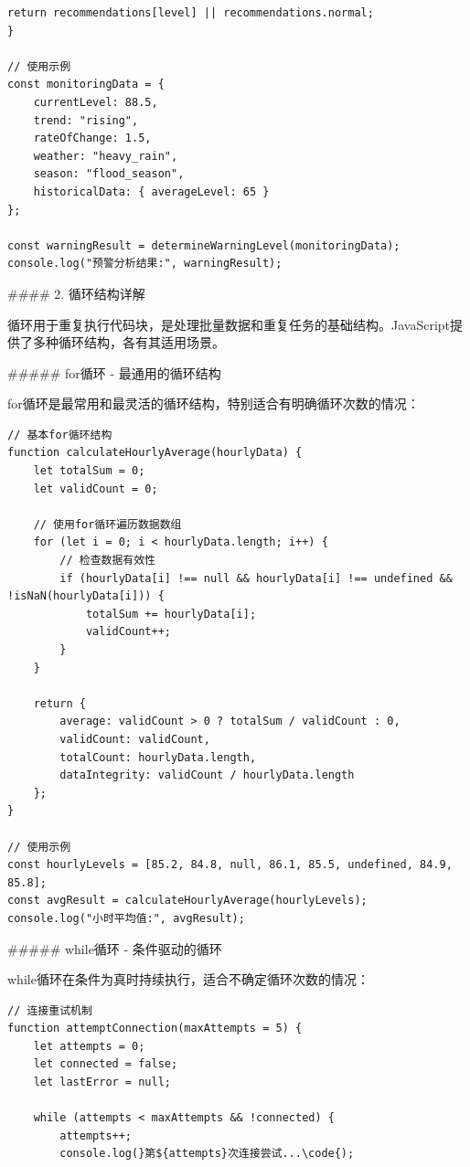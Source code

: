 {\begin{lstlisting}[style=javascript]
    return recommendations[level] || recommendations.normal;
}

// 使用示例
const monitoringData = {
    currentLevel: 88.5,
    trend: "rising",
    rateOfChange: 1.5,
    weather: "heavy_rain",
    season: "flood_season",
    historicalData: { averageLevel: 65 }
};

const warningResult = determineWarningLevel(monitoringData);
console.log("预警分析结果:", warningResult);
\end{lstlisting}

#### 2. 循环结构详解

循环用于重复执行代码块，是处理批量数据和重复任务的基础结构。JavaScript提供了多种循环结构，各有其适用场景。

##### for循环 - 最通用的循环结构

for循环是最常用和最灵活的循环结构，特别适合有明确循环次数的情况：

\begin{lstlisting}[style=javascript]
// 基本for循环结构
function calculateHourlyAverage(hourlyData) {
    let totalSum = 0;
    let validCount = 0;
    
    // 使用for循环遍历数据数组
    for (let i = 0; i < hourlyData.length; i++) {
        // 检查数据有效性
        if (hourlyData[i] !== null && hourlyData[i] !== undefined && !isNaN(hourlyData[i])) {
            totalSum += hourlyData[i];
            validCount++;
        }
    }
    
    return {
        average: validCount > 0 ? totalSum / validCount : 0,
        validCount: validCount,
        totalCount: hourlyData.length,
        dataIntegrity: validCount / hourlyData.length
    };
}

// 使用示例
const hourlyLevels = [85.2, 84.8, null, 86.1, 85.5, undefined, 84.9, 85.8];
const avgResult = calculateHourlyAverage(hourlyLevels);
console.log("小时平均值:", avgResult);
\end{lstlisting}

##### while循环 - 条件驱动的循环

while循环在条件为真时持续执行，适合不确定循环次数的情况：

\begin{lstlisting}[style=javascript]
// 连接重试机制
function attemptConnection(maxAttempts = 5) {
    let attempts = 0;
    let connected = false;
    let lastError = null;
    
    while (attempts < maxAttempts && !connected) {
        attempts++;
        console.log(}第${attempts}次连接尝试...\code{);
        

\end{lstlisting}}
